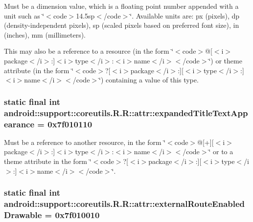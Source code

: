 Must be a dimension value, which is a floating point number appended with a unit such as \char`\"{}$<$code$>$14.5sp$<$/code$>$\char`\"{}. Available units are: px (pixels), dp (density-independent pixels), sp (scaled pixels based on preferred font size), in (inches), mm (millimeters). 

This may also be a reference to a resource (in the form \char`\"{}$<$code$>$@\mbox{[}$<$i$>$package$<$/i$>$:\mbox{]}$<$i$>$type$<$/i$>$:$<$i$>$name$<$/i$>$$<$/code$>$\char`\"{}) or theme attribute (in the form \char`\"{}$<$code$>$?\mbox{[}$<$i$>$package$<$/i$>$:\mbox{]}\mbox{[}$<$i$>$type$<$/i$>$:\mbox{]}$<$i$>$name$<$/i$>$$<$/code$>$\char`\"{}) containing a value of this type. \hypertarget{classandroid_1_1support_1_1coreutils_1_1_r_1_1attr_d9d6c8fdcb8dc12de60cb94fff9b8c97}{
\subsubsection[{expandedTitleTextAppearance}]{\setlength{\rightskip}{0pt plus 5cm}static final int android::support::coreutils.R.R::attr::expandedTitleTextAppearance = 0x7f010110}}
\label{classandroid_1_1support_1_1coreutils_1_1_r_1_1attr_d9d6c8fdcb8dc12de60cb94fff9b8c97}


Must be a reference to another resource, in the form \char`\"{}$<$code$>$@\mbox{[}+\mbox{]}\mbox{[}$<$i$>$package$<$/i$>$:\mbox{]}$<$i$>$type$<$/i$>$:$<$i$>$name$<$/i$>$$<$/code$>$\char`\"{} or to a theme attribute in the form \char`\"{}$<$code$>$?\mbox{[}$<$i$>$package$<$/i$>$:\mbox{]}\mbox{[}$<$i$>$type$<$/i$>$:\mbox{]}$<$i$>$name$<$/i$>$$<$/code$>$\char`\"{}. \hypertarget{classandroid_1_1support_1_1coreutils_1_1_r_1_1attr_31795c4ad64123e21a3b3d10bc989340}{
\subsubsection[{externalRouteEnabledDrawable}]{\setlength{\rightskip}{0pt plus 5cm}static final int android::support::coreutils.R.R::attr::externalRouteEnabledDrawable = 0x7f010010}}
\label{classandroid_1_1support_1_1coreutils_1_1_r_1_1attr_31795c4ad64123e21a3b3d10bc989340}


